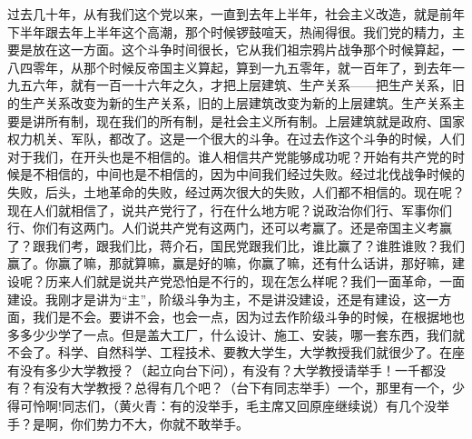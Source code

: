 过去几十年，从有我们这个党以来，一直到去年上半年，社会主义改造，就是前年下半年跟去年上半年这个高潮，那个时候锣鼓喧天，热闹得很。我们党的精力，主要是放在这一方面。这个斗争时间很长，它从我们祖宗鸦片战争那个时候算起，一八四零年，从那个时候反帝国主义算起，算到一九五零年，就一百年了，到去年一九五六年，就有一百一十六年之久，才把上层建筑、生产关系——把生产关系，旧的生产关系改变为新的生产关系，旧的上层建筑改变为新的上层建筑。生产关系主要是讲所有制，现在我们的所有制，是社会主义所有制。上层建筑就是政府、国家权力机关、军队，都改了。这是一个很大的斗争。在过去作这个斗争的时候，人们对于我们，在开头也是不相信的。谁人相信共产党能够成功呢？开始有共产党的时候是不相信的，中间也是不相信的，因为中间我们经过失败。经过北伐战争时候的失败，后头，土地革命的失败，经过两次很大的失败，人们都不相信的。现在呢？现在人们就相信了，说共产党行了，行在什么地方呢？说政治你们行、军事你们行、你们有这两门。人们说共产党有这两门，还可以考赢了。还是帝国主义考赢了？跟我们考，跟我们比，蒋介石，国民党跟我们比，谁比赢了？谁胜谁败？我们赢了。你赢了嘛，那就算嘛，赢是好的嘛，你赢了嘛，还有什么话讲，那好嘛，建设呢？历来人们就是说共产党恐怕是不行的，现在怎么样呢？我们一面革命，一面建设。我刚才是讲为“主”，阶级斗争为主，不是讲没建设，还是有建设，这一方面，我们是不会。要讲不会，也会一点，因为过去作阶级斗争的时候，在根据地也多多少少学了一点。但是盖大工厂，什么设计、施工、安装，哪一套东西，我们就不会了。科学、自然科学、工程技术、要教大学生，大学教授我们就很少了。在座有没有多少大学教授？（起立向台下问），有没有？大学教授请举手！一千都没有？有没有大学教授？总得有几个吧？（台下有同志举手）一个，那里有一个，少得可怜啊!同志们，（黄火青：有的没举手，毛主席又回原座继续说）有几个没举手？是啊，你们势力不大，你就不敢举手。

